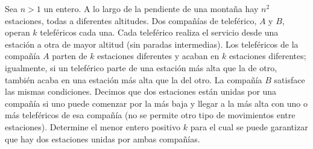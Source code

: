 Sea $n \gt 1$ un entero. A lo largo de la pendiente de una montaña hay $n^2$ estaciones, todas a diferentes altitudes. Dos compañías de teleférico, $A$ y $B$, operan $k$ teleféricos cada una. Cada teleférico realiza el servicio desde una estación a otra de mayor altitud (sin paradas intermedias). Los teleféricos de la compañía $A$ parten de $k$ estaciones diferentes y acaban en $k$ estaciones diferentes; igualmente, si un teleférico parte de una estación más alta que la de otro, también acaba en una estación más alta que la del otro. La compañía $B$ satisface las mismas condiciones. Decimos que dos estaciones están unidas por una compañía si uno puede comenzar por la más baja y llegar a la más alta con uno o más teleféricos de esa compañía (no se permite otro tipo de movimientos entre estaciones).
Determine el menor entero positivo $k$ para el cual se puede garantizar que hay dos estaciones unidas por ambas compañías.